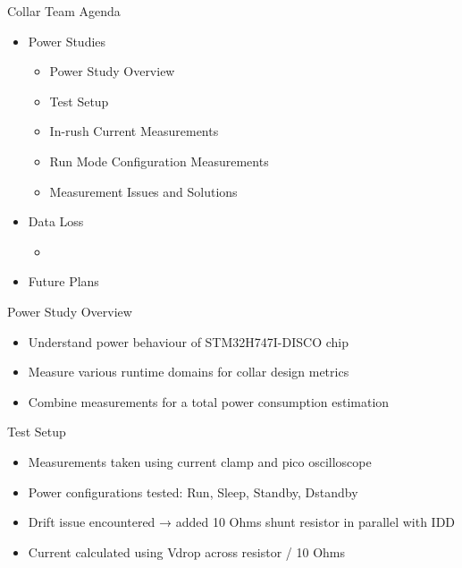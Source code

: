 \begin{frame}{Collar Team Agenda}
    \begin{itemize}
        \item Power Studies
        \begin{itemize}
            \item Power Study Overview
            \item Test Setup 
            \item In-rush Current Measurements
            \item Run Mode Configuration Measurements
            \item Measurement Issues and Solutions
        \end{itemize}
        \item Data Loss
        \begin{itemize}
            \item 
        \end{itemize}
        \item Future Plans
    \end{itemize}
\end{frame}
     
\begin{frame}{Power Study Overview}
    \begin{itemize}
        \item Understand power behaviour of STM32H747I-DISCO chip
        \item Measure various runtime domains for collar design metrics
        \item Combine measurements for a total power consumption estimation
    \end{itemize}
\end{frame}

\begin{frame}{Test Setup}
    \begin{itemize}
        \item Measurements taken using current clamp and pico oscilloscope
        \item Power configurations tested: Run, Sleep, Standby, Dstandby
        \item Drift issue encountered → added 10 Ohms shunt resistor in parallel with IDD
        \item Current calculated using Vdrop across resistor / 10 Ohms
    \end{itemize}  
\end{frame}

